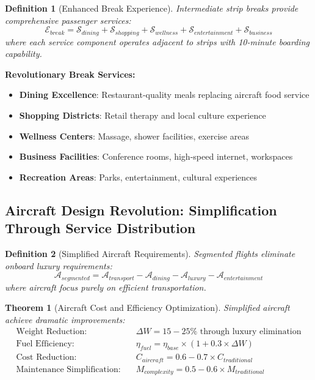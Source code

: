 \documentclass[12pt,a4paper]{article}
\newtheorem{theorem}{Theorem}
\newtheorem{definition}{Definition}
\begin{document}
\begin{definition}[Enhanced Break Experience]
Intermediate strip breaks provide comprehensive passenger services:
\begin{equation}
\mathcal{E}_{break} = \mathcal{S}_{dining} + \mathcal{S}_{shopping} + \mathcal{S}_{wellness} + \mathcal{S}_{entertainment} + \mathcal{S}_{business}
\end{equation}
where each service component operates adjacent to strips with 10-minute boarding capability.
\end{definition}

\textbf{Revolutionary Break Services:}
\begin{itemize}
\item \textbf{Dining Excellence}: Restaurant-quality meals replacing aircraft food service
\item \textbf{Shopping Districts}: Retail therapy and local culture experience  
\item \textbf{Wellness Centers}: Massage, shower facilities, exercise areas
\item \textbf{Business Facilities}: Conference rooms, high-speed internet, workspaces
\item \textbf{Recreation Areas}: Parks, entertainment, cultural experiences
\end{itemize}

\subsection{Aircraft Design Revolution: Simplification Through Service Distribution}

\begin{definition}[Simplified Aircraft Requirements]
Segmented flights eliminate onboard luxury requirements:
\begin{equation}
\mathcal{A}_{segmented} = \mathcal{A}_{transport} - \mathcal{A}_{dining} - \mathcal{A}_{luxury} - \mathcal{A}_{entertainment}
\end{equation}
where aircraft focus purely on efficient transportation.
\end{definition}

\begin{theorem}[Aircraft Cost and Efficiency Optimization]
Simplified aircraft achieve dramatic improvements:
\begin{align}
\text{Weight Reduction:} &\quad \Delta W = 15-25\% \text{ through luxury elimination} \\
\text{Fuel Efficiency:} &\quad \eta_{fuel} = \eta_{base} \times (1 + 0.3 \times \Delta W) \\
\text{Cost Reduction:} &\quad C_{aircraft} = 0.6-0.7 \times C_{traditional} \\
\text{Maintenance Simplification:} &\quad M_{complexity} = 0.5-0.6 \times M_{traditional}
\end{align}
\end{theorem}
\end{document}

